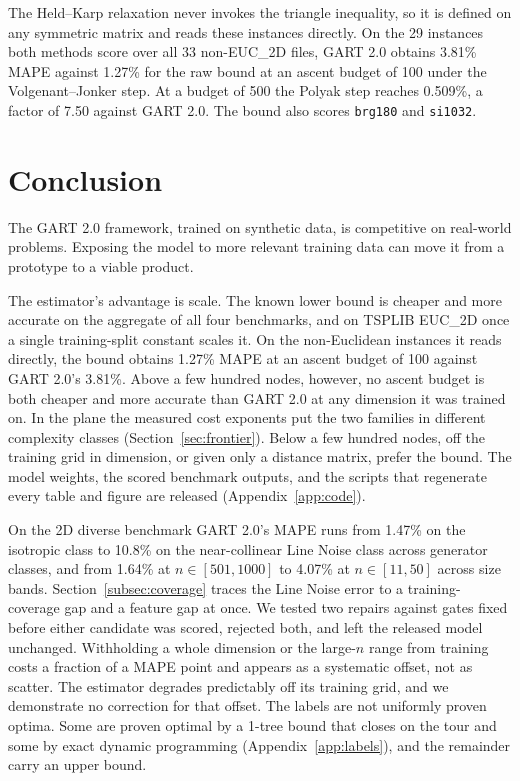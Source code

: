 \documentclass{article}
\begin{document}
The Held--Karp relaxation never invokes the triangle inequality, so it is defined on any symmetric matrix and reads these instances directly. On the 29 instances both methods score over all 33 non-EUC\_2D files, GART 2.0 obtains 3.81\% MAPE against 1.27\% for the raw bound at an ascent budget of 100 under the Volgenant--Jonker step. At a budget of 500 the Polyak step reaches 0.509\%, a factor of 7.50 against GART 2.0. The bound also scores \texttt{brg180} and \texttt{si1032}. 

\section{Conclusion}\label{sec:conclusion}

The GART 2.0 framework, trained on synthetic data, is competitive on real-world problems. Exposing the model to more relevant training data can move it from a prototype to a viable product.

The estimator's advantage is scale. The known lower bound is cheaper and more accurate on the aggregate of all four benchmarks, and on TSPLIB EUC\_2D once a single training-split constant scales it. On the non-Euclidean instances it reads directly, the bound obtains 1.27\% MAPE at an ascent budget of 100 against GART 2.0's 3.81\%. Above a few hundred nodes, however, no ascent budget is both cheaper and more accurate than GART 2.0 at any dimension it was trained on. In the plane the measured cost exponents put the two families in different complexity classes (Section~\ref{sec:frontier}). Below a few hundred nodes, off the training grid in dimension, or given only a distance matrix, prefer the bound. The model weights, the scored benchmark outputs, and the scripts that regenerate every table and figure are released (Appendix~\ref{app:code}).

On the 2D diverse benchmark GART 2.0's MAPE runs from 1.47\% on the isotropic class to 10.8\% on the near-collinear Line Noise class across generator classes, and from 1.64\% at $n\in[501,1000]$ to 4.07\% at $n\in[11,50]$ across size bands. Section~\ref{subsec:coverage} traces the Line Noise error to a training-coverage gap and a feature gap at once. We tested two repairs against gates fixed before either candidate was scored, rejected both, and left the released model unchanged. Withholding a whole dimension or the large-$n$ range from training costs a fraction of a MAPE point and appears as a systematic offset, not as scatter. The estimator degrades predictably off its training grid, and we demonstrate no correction for that offset. The labels are not uniformly proven optima. Some are proven optimal by a 1-tree bound that closes on the tour and some by exact dynamic programming (Appendix~\ref{app:labels}), and the remainder carry an upper bound.
\end{document}
